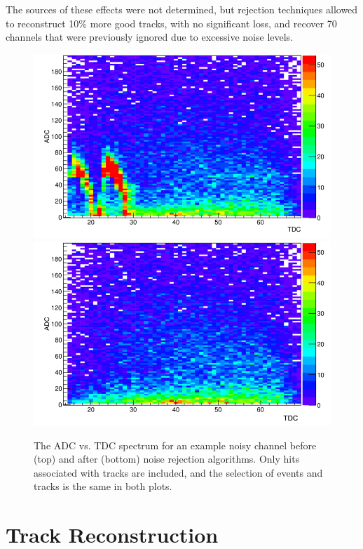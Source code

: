 \documentclass[twocolumn,showpacs,superscriptaddress,groupedaddress]{revtex4}
\begin{document}
The sources of these effects were not determined, but rejection techniques allowed to reconstruct 10\% more good tracks, with no significant loss, and recover 70 channels that were previously ignored due to excessive noise levels.

\begin{figure}[tb]\centering
\includegraphics[scale=0.27]{fig/noisy_pad_before_rejection2.png}
\includegraphics[scale=0.27]{fig/noisy_pad_after_rejection2.png}
\caption{The ADC vs. TDC spectrum for an example noisy channel before (top) and after (bottom) noise rejection algorithms.  Only hits associated with tracks are included, and the selection of events and tracks is the same in both plots.}
\label{fig:noise}
\end{figure}

\section{Track Reconstruction}\label{sec_perf}
\end{document}

